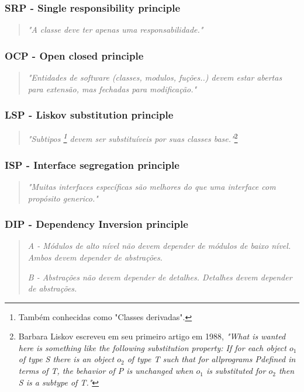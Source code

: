 \documentclass[12pt]{article}
\begin{document}
\subsubsection{SRP - Single responsibility principle}
\begin{quote}
	\textit{"A classe deve ter apenas uma responsabilidade."}	
\end{quote}
\subsubsection{OCP - Open closed principle}
\begin{quote}
	\textit{"Entidades de software (classes, modulos, fuções..) devem estar abertas para extensão, mas fechadas para modificação."}	
\end{quote}
\subsubsection{LSP - Liskov substitution principle}
\begin{quote}
	\textit{"Subtipos \footnote{Também conhecidas como "Classes derivadas".} devem ser substituíveis por suas classes base."}\footnote{Barbara Liskov escreveu em seu primeiro artigo em 1988, \textit{"What is wanted here is something like the following substitution property: If for each object $ o_1 $ of type S there is an object $ o_2 $ of type T such that for allprograms Pdefined in terms of T, the behavior of P is unchanged when $ o_1 $ is substituted for $ o_2 $ then S is a subtype of T."} }	
\end{quote}
\subsubsection{ISP - Interface segregation principle}
\begin{quote}
	\textit{"Muitas interfaces específicas são melhores do que uma interface com propósito generico."}	
\end{quote}
\subsubsection{DIP - Dependency Inversion principle}
\begin{quote}
	\textit{A - Módulos de alto nível não devem depender de módulos de baixo nível. Ambos devem depender de abstrações.}
	
	\textit{B -  Abstrações não devem depender de detalhes. Detalhes devem depender de abstrações.}	
\end{quote}
\end{document}
